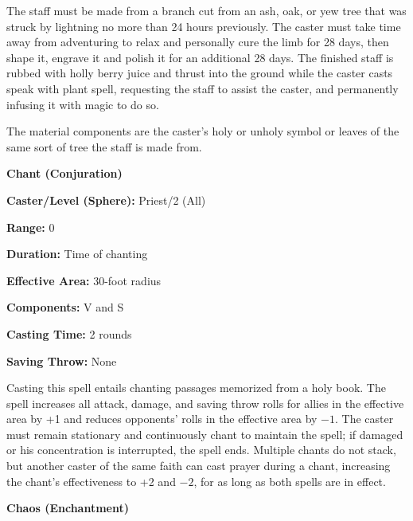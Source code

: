\begin{multicols}{2}
The staff must be made from a branch cut from an ash, oak, or yew tree that was struck by lightning no more than 24 hours previously.  The caster must take time away from adventuring to relax and personally cure the limb for 28 days, then shape it, engrave it and polish it for an additional 28 days.  The finished staff is rubbed with holly berry juice and thrust into the ground while the caster casts speak with plant spell, requesting the staff to assist the caster, and permanently infusing it with magic to do so.

The material components are the caster's holy or unholy symbol or leaves of the same sort of tree the staff is made from.

\vspace{1em}

\noindent
\begin{minipage}{\columnwidth}

\noindent \textbf{Chant (Conjuration)}

\noindent \textbf{Caster/Level (Sphere):} Priest/2 (All)

\noindent \textbf{Range:} 0

\noindent \textbf{Duration:} Time of chanting

\noindent \textbf{Effective Area:} 30-foot radius

\noindent \textbf{Components:} V and S

\noindent \textbf{Casting Time:} 2 rounds

\noindent \textbf{Saving Throw:} None

\end{minipage}

Casting this spell entails chanting passages memorized from a holy book. The spell increases all attack, damage, and saving throw rolls for allies in the effective area by +1 and reduces opponents' rolls in the effective area by $-1$.  The caster must remain stationary and continuously chant to maintain the spell; if damaged or his concentration is interrupted, the spell ends.  Multiple chants do not stack, but another caster of the same faith can cast prayer during a chant, increasing the chant's effectiveness to +2 and $-2$, for as long as both spells are in effect.

\vspace{1em}

\noindent
\begin{minipage}{\columnwidth}

\noindent \textbf{Chaos (Enchantment)}


\end{minipage}
\end{multicols}
